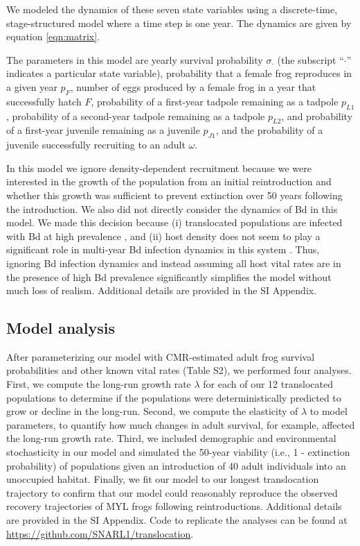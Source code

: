 \documentclass[9pt,twocolumn,twoside,lineno]{pnas-new}
\begin{document}
{We modeled the dynamics of these seven state variables using a
discrete-time, stage-structured model where a time step is one year. The
dynamics are given by equation \ref{eqn:matrix}.

The parameters in this model are yearly survival probability
\(\sigma_{\cdot}\) (the subscript ``\(\cdot\)'' indicates a particular
state variable), probability that a female frog reproduces in a given
year \(p_F\), number of eggs produced by a female frog in a year that
successfully hatch \(F\), probability of a first-year tadpole remaining
as a tadpole \(p_{L1}\), probability of a second-year tadpole remaining
as a tadpole \(p_{L2}\), and probability of a first-year juvenile
remaining as a juvenile \(p_{J1}\), and the probability of a juvenile
successfully recruiting to an adult \(\omega\).

In this model we ignore density-dependent recruitment because we were
interested in the growth of the population from an initial
reintroduction and whether this growth was sufficient to prevent
extinction over 50 years following the introduction. We also did not
directly consider the dynamics of Bd in this model. We made this
decision because (i) translocated populations are infected with Bd at
high prevalence \citep{joseph2018}, and (ii) host density does not seem
to play a significant role in multi-year Bd infection dynamics in this
system \citep{wilber2022}. Thus, ignoring Bd infection dynamics and
instead assuming all host vital rates are in the presence of high Bd
prevalence significantly simplifies the model without much loss of
realism. Additional details are provided in the SI Appendix.

\hypertarget{model-analysis}{%
\subsection*{Model analysis}\label{model-analysis}}

After parameterizing our model with CMR-estimated adult frog survival
probabilities and other known vital rates
(Table S2), we performed four analyses. First, we
compute the long-run growth rate \(\lambda\) for each of our 12
translocated populations to determine if the populations were
deterministically predicted to grow or decline in the long-run. Second,
we compute the elasticity of \(\lambda\) to model parameters, to
quantify how much changes in adult survival, for example, affected the
long-run growth rate. Third, we included demographic and environmental
stochasticity in our model and simulated the 50-year viability (i.e., 1
- extinction probability) of populations given an introduction of 40
adult individuals into an unoccupied habitat. Finally, we fit our model
to our longest translocation trajectory to confirm that our model could
reasonably reproduce the observed recovery trajectories of MYL frogs
following reintroductions. Additional details are provided in the SI
Appendix. Code to replicate the analyses can be found at
\url{https://github.com/SNARL1/translocation}.

}
\end{document}
